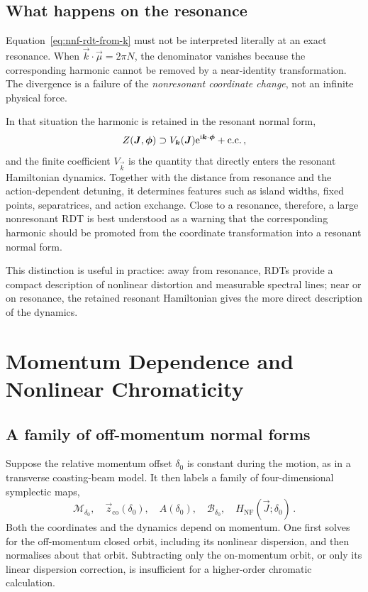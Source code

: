 \subsection{What happens on the resonance}

Equation~\eqref{eq:nnf-rdt-from-k} must not be interpreted literally at an
exact resonance.  When
$\vec k\cdot\vec\mu = 2\pi N$, the denominator vanishes because the
corresponding harmonic cannot be removed by a near-identity transformation.
The divergence is a failure of the \emph{nonresonant coordinate change}, not
an infinite physical force.

In that situation the harmonic is retained in the resonant normal form,
\begin{equation}
    Z(\bm{J},\bm{\phi})
    \supset V_{\bm{k}}(\bm{J})
    \mathrm{e}^{\mathrm{i}\bm{k}\cdot\bm{\phi}} + \text{c.c.}\,,
\end{equation}
and the finite coefficient $V_{\vec k}$ is the quantity that directly enters
the resonant Hamiltonian dynamics.  Together with the distance from resonance
and the action-dependent detuning, it determines features such as island
widths, fixed points, separatrices, and action exchange.  Close to a
resonance, therefore, a large nonresonant RDT is best understood as a warning
that the corresponding harmonic should be promoted from the coordinate
transformation into a resonant normal form.

This distinction is useful in practice: away from resonance, RDTs provide a
compact description of nonlinear distortion and measurable spectral lines;
near or on resonance, the retained resonant Hamiltonian gives the more direct
description of the dynamics.



\section{Momentum Dependence and Nonlinear Chromaticity}

\subsection{A family of off-momentum normal forms}

Suppose the relative momentum offset $\delta_0$ is constant during the
motion, as in a transverse coasting-beam model.  It then labels a family
of four-dimensional symplectic maps,
\begin{equation}
    \mathcal M_{\delta_0},\quad
    \vec z_{\mathrm{co}}(\delta_0),\quad A(\delta_0),\quad
    \mathcal B_{\delta_0},\quad H_{\mathrm{NF}}(\vec J;\delta_0)\,.
\end{equation}
Both the coordinates and the dynamics depend on momentum.  One first
solves for the off-momentum closed orbit, including its nonlinear
dispersion, and then normalises about that orbit.  Subtracting only the
on-momentum orbit, or only its linear dispersion correction, is
insufficient for a higher-order chromatic calculation.

